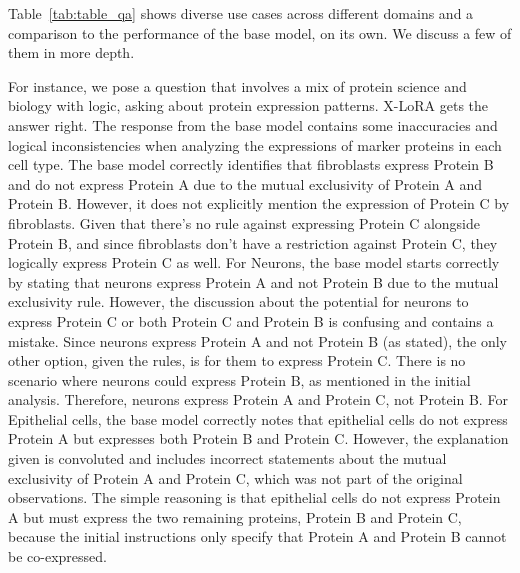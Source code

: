 Table~\ref{tab:table_qa} shows diverse use cases across different domains and a comparison to the performance of the base model, on its own. We discuss a few of them in more depth.

For instance, we pose a question that involves a mix of protein science and biology with logic, asking about protein expression patterns. X-LoRA gets the answer right. The  response from the base model contains some inaccuracies and logical inconsistencies when analyzing the expressions of marker proteins in each cell type. The base model correctly identifies that fibroblasts express Protein B and do not express Protein A due to the mutual exclusivity of Protein A and Protein B. However, it does not explicitly mention the expression of Protein C by fibroblasts. Given that there's no rule against expressing Protein C alongside Protein B, and since fibroblasts don't have a restriction against Protein C, they logically express Protein C as well. For Neurons, the base model starts correctly by stating that neurons express Protein A and not Protein B due to the mutual exclusivity rule. However, the discussion about the potential for neurons to express Protein C or both Protein C and Protein B is confusing and contains a mistake. Since neurons express Protein A and not Protein B (as stated), the only other option, given the rules, is for them to express Protein C. There is no scenario where neurons could express Protein B, as mentioned in the initial analysis. Therefore, neurons express Protein A and Protein C, not Protein B. For Epithelial cells, the base model correctly notes that epithelial cells do not express Protein A but expresses both Protein B and Protein C. However, the explanation given is convoluted and includes incorrect statements about the mutual exclusivity of Protein A and Protein C, which was not part of the original observations. The simple reasoning is that epithelial cells do not express Protein A but must express the two remaining proteins, Protein B and Protein C, because the initial instructions only specify that Protein A and Protein B cannot be co-expressed. 

